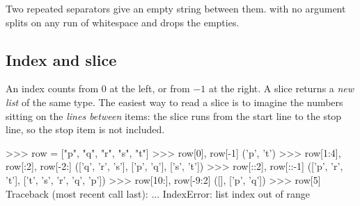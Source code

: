 Two repeated separators give an empty string between them.  with no argument splits on any run
of whitespace and drops the empties.

\subsection{Index and slice}

An index counts from 0 at the left, or from $-1$ at the right. A slice  returns a
\emph{new list} of the same type. The easiest way to read a slice is to imagine the numbers sitting on the
\emph{lines between} items: the slice runs from the start line to the stop line, so the stop item is not
included.

\begin{center}
\end{center}

\begin{pycode}
>>> row = ["p", "q", "r", "s", "t"]
>>> row[0], row[-1]
('p', 't')
>>> row[1:4], row[:2], row[-2:]
(['q', 'r', 's'], ['p', 'q'], ['s', 't'])
>>> row[::2], row[::-1]
(['p', 'r', 't'], ['t', 's', 'r', 'q', 'p'])
>>> row[10:], row[-9:2]
([], ['p', 'q'])
>>> row[5]
Traceback (most recent call last):
  ...
IndexError: list index out of range
\end{pycode}

